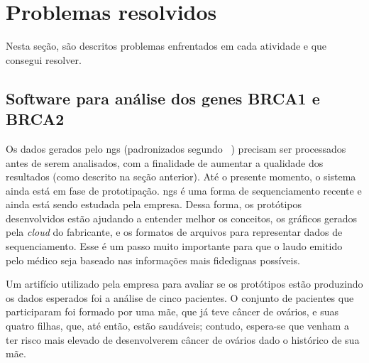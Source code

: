 
%
%


\section{Problemas resolvidos}
Nesta seção, são descritos problemas enfrentados em cada atividade e que consegui resolver.

\subsection{Software para análise dos genes BRCA1 e BRCA2}

Os dados gerados pelo \gls{ngs} (padronizados segundo ~\cite{SamTools}) precisam ser processados antes de serem analisados, com a finalidade de aumentar a qualidade
dos resultados (como descrito na seção anterior).
Até o presente momento, o sistema ainda está em fase de prototipação. \gls{ngs} é uma forma de sequenciamento
recente e ainda está sendo estudada pela empresa. Dessa forma, os protótipos desenvolvidos estão ajudando a entender melhor os conceitos, os gráficos
gerados pela \textit{cloud} do fabricante, e os formatos de arquivos para representar dados de sequenciamento. Esse é um passo muito importante para que
o laudo emitido pelo médico seja baseado nas informações mais fidedignas possíveis.

Um artifício utilizado pela empresa para avaliar se os protótipos estão produzindo os dados esperados foi a análise de cinco pacientes.
O conjunto de pacientes que participaram foi formado por uma mãe, que já teve câncer de ovários, e suas quatro filhas, que, até então, estão saudáveis;
contudo, espera-se que venham a ter risco mais elevado de desenvolverem câncer de ovários dado o histórico de sua mãe.

